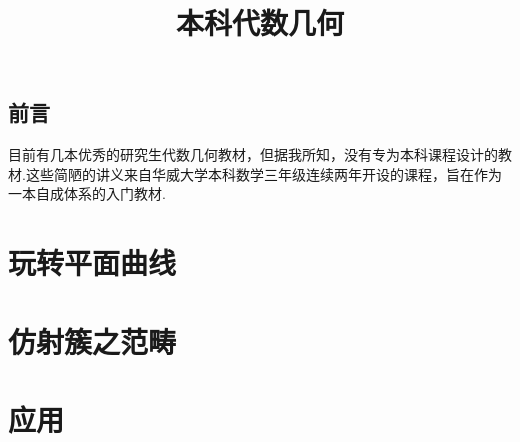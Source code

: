 \documentclass[lang=cn,a4paper,11pt,openany,twoside]{elegantbook}
\newcommand{\ForceRightPage}{%
  \clearpage
  \ifodd\value{page}\relax
  \else
    \hbox{}\thispagestyle{empty}\newpage
  \fi
}
\begin{document}
\title{本科代数几何}
\maketitle

\chapter*{前言}

目前有几本优秀的研究生代数几何教材，但据我所知，没有专为本科课程设计的教材.这些简陋的讲义来自华威大学本科数学三年级连续两年开设的课程，旨在作为一本自成体系的入门教材.

\frontmatter
{}     %
\clearpage
\tableofcontents
\clearpage

\ForceRightPage
\mainmatter





\part{玩转平面曲线}







\part{仿射簇之范畴}





\part{应用}








\end{document}
